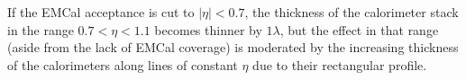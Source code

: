 If the EMCal acceptance is cut to $|\eta| < 0.7$, the thickness of the
calorimeter stack in the range $0.7 < \eta < 1.1$ becomes thinner by
$1 \lambda$, but the effect in that range (aside from the lack of
EMCal coverage) is moderated by the increasing thickness of the
calorimeters along lines of constant $\eta$ due to their rectangular
profile.


